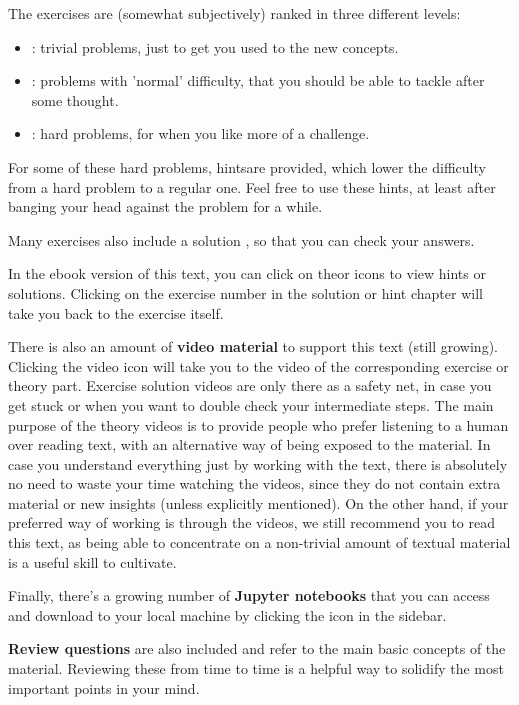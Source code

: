 The exercises are (somewhat subjectively) ranked in three different levels:

\begin{itemize}
\item \iconoffset\trivial : trivial problems, just to get you used to the new concepts.
\item \iconoffset\normal : problems with 'normal' difficulty, that you should be able to tackle after some thought.
\item \iconoffset\hard : hard problems, for when you like more of a challenge.
\end{itemize}

For some of these hard problems, hints\iconoffset\hint are provided, which lower the difficulty from a hard problem to a regular one. Feel free to use these hints, at least after banging your head against the problem for a while.

Many exercises also include a solution \iconoffset\solution, so that you can check your answers.

In the ebook version of this text, you can click on the\iconoffset\hint or \iconoffset\solution icons to view hints or solutions. Clicking on the exercise number in the solution or hint chapter will take you back to the exercise itself.

There is also an amount of \textbf{video material} to support this text (still growing). Clicking the video icon \iconoffset\youtube will take you to the video of the corresponding exercise or theory part. Exercise solution videos are only there as a safety net, in case you get stuck or when you want to double check your intermediate steps. The main purpose of the theory videos is to provide people who prefer listening to a human over reading text, with an alternative way of being exposed to the material. In case you understand everything just by working with the text, there is absolutely no need to waste your time watching the videos, since they do not contain extra material or new insights (unless explicitly mentioned). On the other hand, if your preferred way of working is through the videos, we still recommend you to read this text, as being able to concentrate on a non-trivial amount of textual material is a useful skill to cultivate.

Finally, there's a growing number of \textbf{Jupyter notebooks} that you can access and download to your local machine by clicking the icon \iconoffset\jupyter in the sidebar.

\textbf{Review questions} are also included and refer to the main basic concepts of the material. Reviewing these from time to time is a helpful way to solidify the most important points in your mind.

